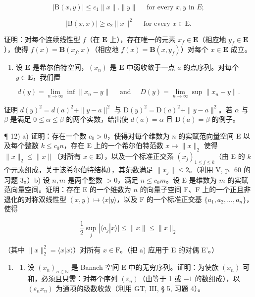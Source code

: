 \[
\left| \mathrm{B} (x, y) \right| \leqslant c _ {1} \| x \|. \| y \| \quad \text { for   every } x, y \text { in } E;
\]

\[
\left| \mathrm{B} (x, x) \right| \geqslant c _ {2} \| x \| ^ {2} \quad \text {   for   every   } x \in \mathrm{E}.
\]

证明：对每个连续线性型 \(f\)（在 \(\mathbf{E}\) 上），存在唯一的元素 \(x_{f} \in \mathbf{E}\)（相应地 \(y_{f} \in \mathbf{E}\)），使得 \(f(x) = \mathbf{B}(x_{f}, x)\)（相应地 \(f(x) = \mathbf{B}(x, y_{f})\)）对每个 \(x \in \mathbf{E}\) 成立。

\begin{enumerate}
\def\labelenumi{\arabic{enumi})}
\setcounter{enumi}{10}
\tightlist
\item
  设 \(\mathbf{E}\) 是希尔伯特空间，\((x_{n})\) 是 \(\mathbf{E}\) 中弱收敛于一点 \(a\) 的点序列。对每个 \(y \in \mathbf{E}\)，我们置
\end{enumerate}

\[
d (y) = \lim _ {n \rightarrow \infty} \inf \| x _ {n} - y \| \quad \text { and } \quad D (y) = \lim _ {n \rightarrow \infty} \sup \| x _ {n} - y \|.
\]

证明 \(d(y)^2 = d(a)^2 + \| y - a\|^2\) 与 \(\mathrm{D}(y)^2 = \mathrm{D}(a)^2 + \| y - a\|^2\)。若 \(\alpha\) 与 \(\beta\) 是满足 \(0 \leqslant \alpha \leqslant \beta\) 的两个实数，给出使 \(d(a) = \alpha\) 且 \(\mathrm{D}(a) = \beta\) 的例子。

¶ 12) a) 证明：存在一个数 \(c_{0} > 0\)，使得对每个维数为 \(n\) 的实赋范向量空间 E 以及每个整数 \(k \leqslant c_{0} n\)，存在 E 上的一个希尔伯特范数 \(x \mapsto \| x \|_{2}\) 使得 \(\| x \|_{2} \leqslant \| x \|\)（对所有 \(x \in \mathbf{E}\)），以及一个标准正交系 \((x_{j})_{1 \leqslant j \leqslant k}\)（由 E 的 \(k\) 个元素组成，关于该希尔伯特结构），其范数满足 \(\| x_{j} \| \leqslant 2\)。（利用 V, p.~60 的习题 3。）b) 设 \(n, m\) 是两个整数 \(> 0\)，满足 \(n \leqslant c_{0} m\)。设 E 是维数为 \(m\) 的实赋范向量空间。证明：存在 E 的一个维数为 \(n\) 的向量子空间 F、F 上的一个正且非退化的对称双线性型 \((x, y) \mapsto \langle x | y \rangle\)，以及 F 的一个标准正交基 \(\{a_{1}, a_{2}, ..., a_{n}\}\)，使得

\[
\frac {1}{2} \sup _ {j} | \langle a _ {j} | x \rangle | \leqslant \| x \| \leqslant \| x \| _ {2}
\]

（其中 \(\| x\| _2^2 = \langle x|x\rangle\)）对所有 \(x\in \mathrm{F}\)。（把 a) 应用于 E 的对偶 E'。）

\begin{enumerate}
\def\labelenumi{\arabic{enumi})}
\setcounter{enumi}{12}
\tightlist
\item
  \begin{enumerate}
  \def\labelenumii{\alph{enumii})}
  \tightlist
  \item
    设 \((x_{n})_{n\in \mathbb{N}}\) 是 Banach 空间 E 中的无穷序列。证明：为使族 \((x_{n})\) 可和，必须且只需：对每个序列 \((\varepsilon_{n})\)（由等于 1 或 \(-1\) 的数组成），以 \((\varepsilon_{n}x_{n})\) 为通项的级数收敛（利用 GT, III, § 5, 习题 4）。
  \end{enumerate}
\end{enumerate}

